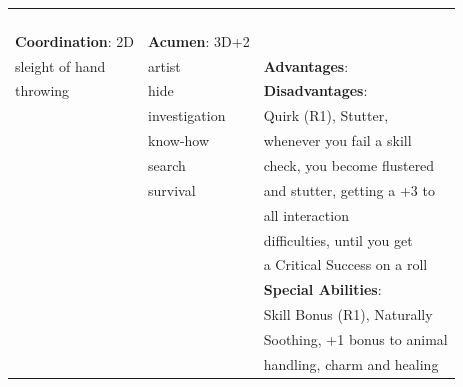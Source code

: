 \documentclass[10pt]{article}
\begin{document}
\begin{table}
\begin{tabular}{m{156pt} m{156pt} m{156pt}}
 \hrulefill &  \hrulefill & \\

 \hrulefill &  \hrulefill & \\

 \hrulefill &  \hrulefill & \\

 \hrulefill &  \hrulefill & \\


\textbf{Coordination}: 2D \hrulefill & \textbf{Acumen}: 3D+2 \hrulefill     & \hrulefill \\

sleight of hand      \hrulefill & artist               \hrulefill & \textbf{Advantages}: \hrulefill \\

throwing             \hrulefill & hide                 \hrulefill & \textbf{Disadvantages}: \hrulefill \\

 \hrulefill & investigation        \hrulefill & Quirk (R1), Stutter, \hrulefill \\

 \hrulefill & know-how             \hrulefill & whenever you fail a skill \hrulefill \\

 \hrulefill & search               \hrulefill & check, you become flustered \hrulefill \\

 \hrulefill & survival             \hrulefill & and stutter, getting a +3 to \hrulefill \\

 \hrulefill &  \hrulefill & all interaction \hrulefill \\

 \hrulefill &  \hrulefill & difficulties, until you get \hrulefill \\

 \hrulefill &  \hrulefill & a Critical Success on a roll \hrulefill \\

 \hrulefill &  \hrulefill & \textbf{Special Abilities}: \hrulefill \\

 \hrulefill &  \hrulefill & Skill Bonus (R1), Naturally \hrulefill \\

 \hrulefill &  \hrulefill & Soothing, +1 bonus to animal \hrulefill \\

 \hrulefill &  \hrulefill & handling, charm and healing \hrulefill \\



\end{tabular}
\end{table}
\end{document}
